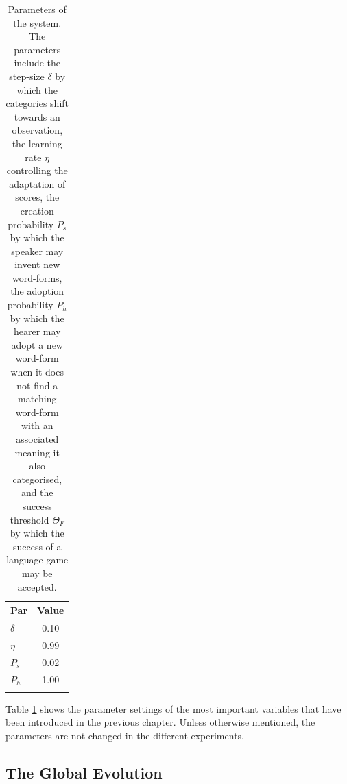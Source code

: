 \begin{table}
\centering
\begin{tabular}{lc}
\lsptoprule
Par & Value\\\midrule
$\delta$ & 0.10\\%
$\eta$ & 0.99\\%
$P_s$ & 0.02\\%
$P_h$ & 1.00\\%
\lspbottomrule
\end{tabular}
\caption{Parameters of the system. The parameters include the step-size $\delta$ by which the categories shift towards an observation, the learning rate $\eta$ controlling the adaptation of scores, the creation probability $P_s$ by which the speaker may invent new word-forms, the adoption probability $P_h$ by which the hearer may adopt a new word-form when it does not find a matching word-form with an associated meaning it also categorised, and the success threshold $\Theta_F$ by which the success of a language game may be accepted.}
\label{t:st:param}
\end{table}


Table \ref{t:st:param} shows the parameter settings of the most important variables that have been introduced in the previous chapter. Unless otherwise mentioned, the parameters are not changed in the different experiments.

\subsection{The Global Evolution}

